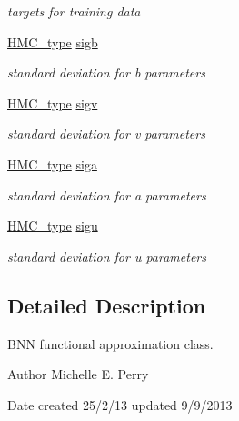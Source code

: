 \begin{DoxyCompactItemize}
\begin{DoxyCompactList}\small\item\em targets for training data \end{DoxyCompactList}\item 
\hyperlink{define__type_8h_a9adf655d34223b34db3baff5c7ce420c}{H\-M\-C\-\_\-type} \hyperlink{class_b_n_n__regression_a6c793005c574b73cfe7d0e1776c21c52}{sigb}
\begin{DoxyCompactList}\small\item\em standard deviation for b parameters \end{DoxyCompactList}\item 
\hyperlink{define__type_8h_a9adf655d34223b34db3baff5c7ce420c}{H\-M\-C\-\_\-type} \hyperlink{class_b_n_n__regression_af06eef668a70e92a122b185c55003b66}{sigv}
\begin{DoxyCompactList}\small\item\em standard deviation for v parameters \end{DoxyCompactList}\item 
\hyperlink{define__type_8h_a9adf655d34223b34db3baff5c7ce420c}{H\-M\-C\-\_\-type} \hyperlink{class_b_n_n__regression_a608b84f81e365e0fd18662583982bc1f}{siga}
\begin{DoxyCompactList}\small\item\em standard deviation for a parameters \end{DoxyCompactList}\item 
\hyperlink{define__type_8h_a9adf655d34223b34db3baff5c7ce420c}{H\-M\-C\-\_\-type} \hyperlink{class_b_n_n__regression_ac7097e88870f47f312e8de1c6f81c04b}{sigu}
\begin{DoxyCompactList}\small\item\em standard deviation for u parameters \end{DoxyCompactList}\end{DoxyCompactItemize}


\subsection{Detailed Description}
B\-N\-N functional approximation class. 





\begin{DoxyAuthor}{Author}
Michelle E. Perry 
\end{DoxyAuthor}
\begin{DoxyDate}{Date}
created 25/2/13 updated 9/9/2013 
\end{DoxyDate}


